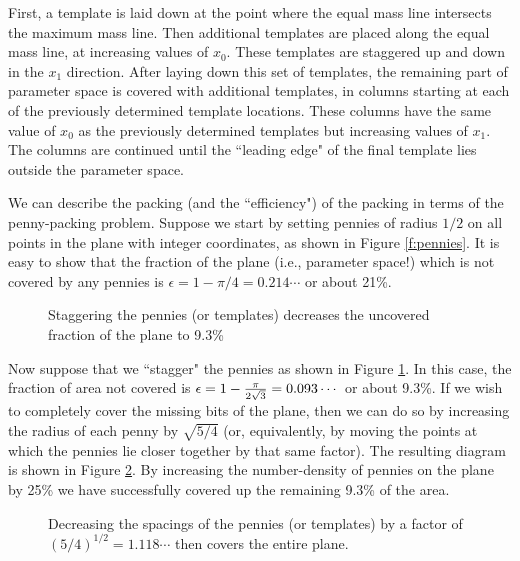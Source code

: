 First, a template is laid down at the point where the equal mass line
intersects the maximum mass line.  Then additional templates are placed
along the equal mass line, at increasing values of $x_0$.  These
templates are staggered up and down in the $x_1$ direction.  After
laying down this set of templates, the remaining part of parameter
space is covered with additional templates, in columns starting at each
of the previously determined template locations.  These columns have
the same value of $x_0$ as the previously determined templates but
increasing values of $x_1$.  The columns are continued until the
``leading edge" of the final template lies outside the parameter
space.

We can describe the packing (and the ``efficiency") of the packing in
terms of the penny-packing problem.  Suppose we start by setting
pennies of radius $1/2$ on all points in the plane with integer
coordinates, as shown in Figure \ref{f:pennies}.  It is easy to show
that the fraction of the plane (i.e., parameter space!) which is not
covered by any pennies is $\epsilon = 1-\pi/4 =0.214\cdots$ or about
21\%.
 
\begin{figure}[h]
\begin{center}
\caption{\label{f:pennies2} Staggering the pennies (or templates)
decreases the uncovered fraction of the plane to 9.3\%}
\end{center}
\end{figure}

Now suppose that we ``stagger" the pennies as shown in Figure
\ref{f:pennies2}.  In this case, the fraction of area not covered is
$\epsilon = 1 - {\pi \over 2 \sqrt{3}} =0.093\cdots$ or about 9.3\%. If
we wish to completely cover the missing bits of the plane, then we can
do so by increasing the radius of each penny by $\sqrt{5/4}$ (or,
equivalently, by moving the points at which the pennies lie closer
together by that same factor).  The resulting diagram is shown in
Figure \ref{f:pennies3}.  By increasing the number-density of pennies
on the plane by 25\% we have successfully covered up the remaining
9.3\% of the area.

\begin{figure}[h]
\begin{center}
\caption{ \label{f:pennies3} Decreasing the spacings of the pennies (or
templates) by a factor of $(5/4)^{1/2}=1.118\cdots$ then covers the
entire plane.}
\end{center}
\end{figure}

